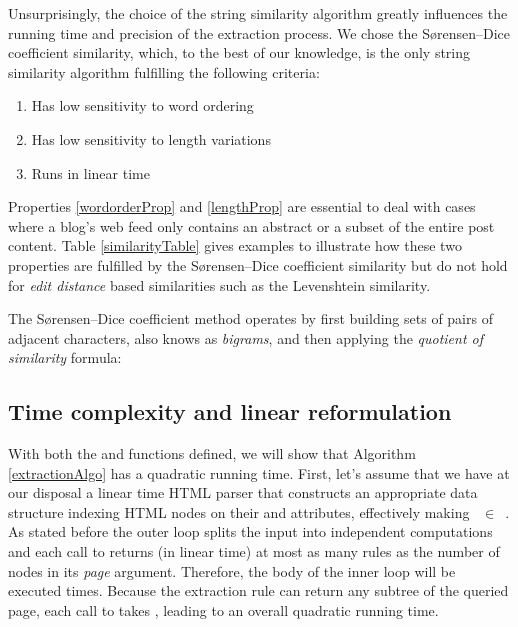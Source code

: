 \allrulesAlgo

Unsurprisingly, the choice of the string similarity algorithm greatly influences the running time and precision of the extraction process. We chose the Sørensen–Dice coefficient similarity\cite{dice1945}, which, to the best of our knowledge, is the only string similarity algorithm fulfilling the following criteria:

\begin{enumerate}
  \item\label{wordorderProp} Has low sensitivity to word ordering
  \item\label{lengthProp} Has low sensitivity to length variations
  \item\label{linearProp} Runs in linear time
\end{enumerate}

Properties \ref{wordorderProp} and \ref{lengthProp} are essential to deal with cases where a blog's web feed only contains an abstract or a subset of the entire post content. Table \ref{similarityTable} gives examples to illustrate how these two properties are fulfilled by the Sørensen–Dice coefficient similarity but do not hold for \emph{edit distance} based similarities such as the Levenshtein\cite{levenshtein1966} similarity.

\similarityTable

The Sørensen–Dice coefficient method operates by first building sets of pairs of adjacent characters, also knows as \emph{bigrams}, and then applying the \emph{quotient of similarity} formula:

\similarityAlgo

\subsection{Time complexity and linear reformulation}
With both the  and  functions defined, we will show that Algorithm \ref{extractionAlgo} has a quadratic running time. First, let's assume that we have at our disposal a linear time HTML parser that constructs an appropriate data structure indexing HTML nodes on their  and  attributes, effectively making ~$\in$~. As stated before the outer loop splits the input into independent computations and each call to  returns (in linear time) at most as many rules as the number of nodes in its \emph{page} argument. Therefore, the body of the inner loop will be executed  times. Because the extraction rule can return any subtree of the queried page, each call to  takes , leading to an overall quadratic running time.

